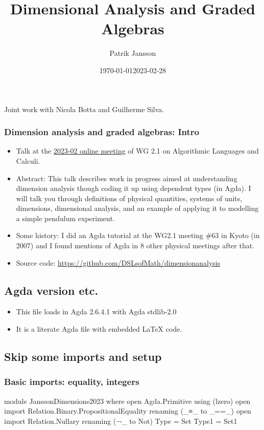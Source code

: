 \documentclass[aspectratio=169]{beamer}
\author[Jansson]{Patrik Jansson}
\date{\today}
\institute[FP unit, Chalmers]{Functional Programming unit, Chalmers University of Technology}
\date{2023-02-28}
\title{Dimensional Analysis and Graded Algebras}
\begin{document}
\begin{frame}
  \maketitle
  Joint work with Nicola Botta and Guilherme Silva.
\end{frame}
\begin{frame}
\frametitle{Dimension analysis and graded algebras: Intro}
\begin{itemize}
\item Talk at the \href{https://ifipwg21wiki.cs.kuleuven.be/IFIP21/OnlineFeb23}{2023-02 online meeting} of WG 2.1 on Algorithmic Languages and Calculi.
\item Abstract:
This talk describes work in progress aimed at understanding dimension analysis
though coding it up using dependent types (in Agda). I will talk you through
definitions of physical quantities, systems of units, dimensions, dimensional
analysis, and an example of applying it to modelling a simple pendulum
experiment.
\item Some history: I did an Agda tutorial at the WG2.1 meeting \#63 in Kyoto
(in 2007) and I found mentions of Agda in 8 other physical meetings after
that.
\item Source code: \url{https://github.com/DSLsofMath/dimensionanalysis}
\end{itemize}
\subsection{Agda version etc.}
\begin{itemize}
\item This file loads in Agda 2.6.4.1 with Agda stdlib-2.0
\item It is a literate Agda file with embedded LaTeX code.
\end{itemize}
\subsection{Skip some imports and setup}
\subsubsection{Basic imports: equality, integers}
\begin{code}
module JanssonDimensions2023 where
open Agda.Primitive using (lzero)
open import Relation.Binary.PropositionalEquality renaming (_≡_ to _==_)
open import Relation.Nullary renaming (¬_ to Not)
Type = Set
Type1 = Set1


\end{code}
\end{frame}
\end{document}
